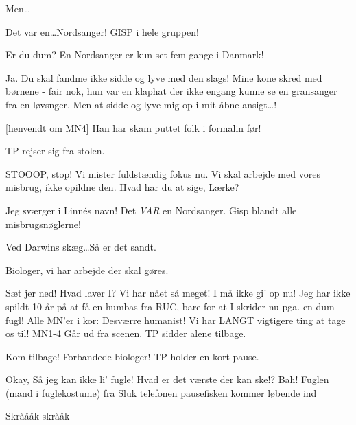 \documentclass[a4paper,12pt]{article}
\begin{document}
\begin{sketch}
 Men\ldots 

 Det var en\ldots  Nordsanger!
\scene GISP i hele gruppen!

 Er du dum? En Nordsanger er kun set fem gange i Danmark!

 Ja. Du skal fandme ikke sidde og lyve med den slags! Mine kone
skred med børnene - fair nok, hun var en klaphat der ikke engang kunne
se en gransanger fra en løvsnger. Men at sidde og lyve mig op i mit
åbne ansigt\ldots !

[henvendt om MN4] Han har skam puttet folk i formalin før!

\scene TP rejser sig fra stolen.

 STOOOP, stop! Vi mister fuldstændig fokus nu. Vi skal
arbejde med vores misbrug, ikke opildne den. Hvad har du at sige,
Lærke?

  Jeg sværger i Linnés navn! Det \emph{VAR} en Nordsanger. 
\scene Gisp blandt alle misbrugsnøglerne!

 Ved Darwins skæg\ldots  Så er det sandt. 

Biologer, vi har arbejde der skal gøres.

 Sæt jer ned! Hvad laver I? Vi har nået så meget! I må ikke
gi' op nu! Jeg har ikke spildt 10 år på at få en humbas fra RUC, bare for at I skrider nu pga. en dum fugl!
\scene \underline{Alle MN'er i kor:} Desværre humanist! Vi har LANGT vigtigere ting at tage os til!
\scene MN1-4 Går ud fra scenen. TP sidder alene tilbage.

 Kom tilbage! Forbandede biologer!
\scene TP holder en kort pause.

 Okay, Så jeg kan ikke li' fugle! Hvad er det værste der kan ske!? Bah!
\scene Fuglen (mand i fuglekostume) fra Sluk telefonen pausefisken
kommer løbende ind

 Skråååk skrååk 



\end{sketch}
\end{document}
